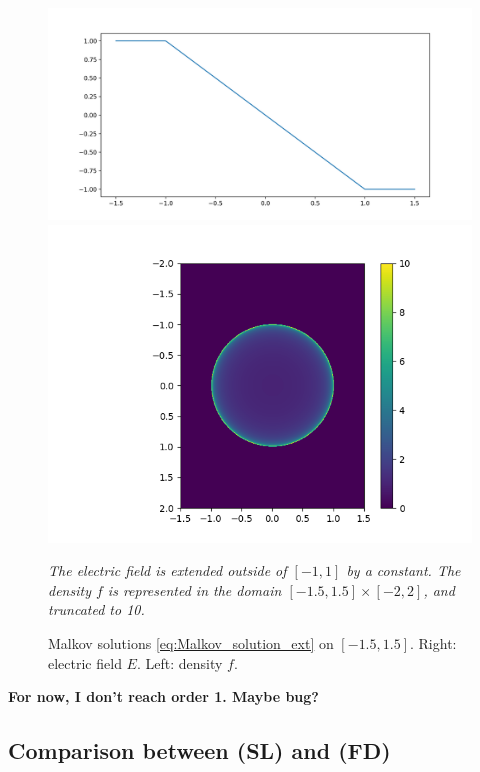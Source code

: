 \documentclass{article}
\numberwithin{equation}{section}
\newcommand{\todo}[1]{{\color{red}\textbf{#1}}}
\newcommand{\mysubcaption}[1]{
	\vspace*{5pt}
	\begin{minipage}{0.8\linewidth}
		\begin{center}
			\footnotesize\emph{#1}
		\end{center}
	\end{minipage}
}
\newcommand{\imh}{\textwidth} %
\begin{document}
\begin{figure}
	\centering
	\renewcommand{\imh}{0.33\linewidth}
	\includegraphics[trim = 50 10 55 30, clip, height=\imh]{images/malkov_solution_Ee}
	\includegraphics[trim = 100 10 60 30, clip, height=\imh]{images/malkov_solution_fe}
	\caption{Malkov solutions \cref{eq:Malkov_solution_ext} on $[-1.5,1.5]$. Right: electric field $E$. Left: density $f$.}
	\mysubcaption{The electric field is extended outside of $[-1,1]$ by a constant. The density $f$ is represented in the domain $[-1.5,1.5]\times[-2,2]$, and truncated to 10.}
	\label{fig:malkov_solutions}
\end{figure}

\todo{For now, I don't reach order 1. Maybe bug?}

	
	

\subsection{Comparison between (SL) and (FD)}
\end{document}
